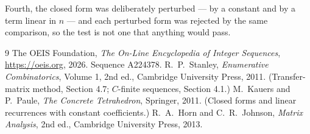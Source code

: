 \documentclass[11pt,a4paper]{article}
\theoremstyle{plain}
\theoremstyle{definition}
\begin{document}
Fourth, the closed form was deliberately perturbed --- by a constant and by a term linear in
$n$ --- and each perturbed form was rejected by the same comparison, so the test is not one
that anything would pass.

\begin{thebibliography}{9}
 The OEIS Foundation, \emph{The On-Line Encyclopedia of Integer
Sequences}, \url{https://oeis.org}, 2026. Sequence A224378.
 R.~P.~Stanley, \emph{Enumerative Combinatorics}, Volume 1, 2nd ed.,
Cambridge University Press, 2011. (Transfer-matrix method, Section 4.7; $C$-finite sequences,
Section 4.1.)
 M.~Kauers and P.~Paule, \emph{The Concrete Tetrahedron}, Springer, 2011.
(Closed forms and linear recurrences with constant coefficients.)
 R.~A.~Horn and C.~R.~Johnson, \emph{Matrix Analysis}, 2nd ed., Cambridge
University Press, 2013.
\end{thebibliography}
\end{document}
